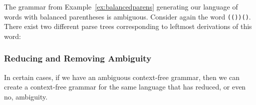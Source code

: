 \begin{example}
The grammar from Example~\ref{ex:balancedparens} generating our language of words with balanced parentheses is ambiguous. Consider again the word \texttt{(())()}. There exist two different parse trees corresponding to leftmost derivations of this word:

\begin{center}
\end{center}
\end{example}

\subsubsection*{Reducing and Removing Ambiguity}

In certain cases, if we have an ambiguous context-free grammar, then we can create a context-free grammar for the same language that has reduced, or even no, ambiguity.

